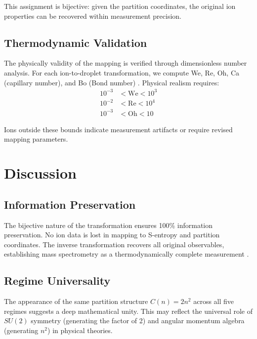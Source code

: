 \documentclass[twocolumn,aps,prd,superscriptaddress,nofootinbib]{revtex4-2}
\newcommand{\We}{\mathrm{We}}
\newcommand{\Rey}{\mathrm{Re}}
\newcommand{\Oh}{\mathrm{Oh}}
\begin{document}
This assignment is bijective: given the partition coordinates, the original ion properties can be recovered within measurement precision.

\subsection{Thermodynamic Validation}

The physically validity of the mapping is verified through dimensionless number analysis. For each ion-to-droplet transformation, we compute We, Re, Oh, Ca (capillary number), and Bo (Bond number) \cite{clift1978bubbles}. Physical realism requires:
\begin{align}
10^{-3} &< \We < 10^3 \\
10^{-2} &< \Rey < 10^4 \\
10^{-3} &< \Oh < 10
\end{align}

Ions outside these bounds indicate measurement artifacts or require revised mapping parameters.

\section{Discussion}
\label{sec:discussion}

\subsection{Information Preservation}

The bijective nature of the transformation ensures 100\% information preservation. No ion data is lost in mapping to S-entropy and partition coordinates. The inverse transformation recovers all original observables, establishing mass spectrometry as a thermodynamically complete measurement \cite{vonneumann1955mathematical, zurek2003decoherence}.

\subsection{Regime Universality}

The appearance of the same partition structure $C(n) = 2n^2$ across all five regimes suggests a deep mathematical unity. This may reflect the universal role of $SU(2)$ symmetry (generating the factor of 2) and angular momentum algebra (generating $n^2$) in physical theories.
\end{document}

